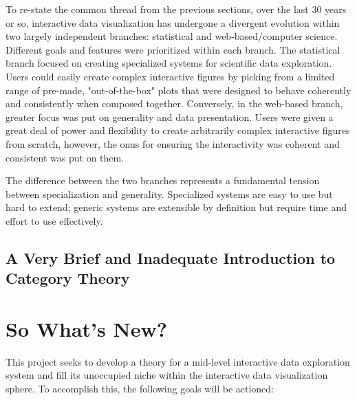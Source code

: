 \documentclass[12pt,a4paper]{article}
\begin{document}
To re-state the common thread from the previous sections, over the last 30 years or so, interactive data visualization has undergone a divergent evolution within two largely independent branches: statistical and web-based/computer science. Different goals and features were prioritized within each branch. The statistical branch focused on creating specialized systems for scientific data exploration. Users could easily create complex interactive figures by picking from a limited range of pre-made, "out-of-the-box" plots that were designed to behave coherently and consistently when composed together. Conversely, in the web-based branch, greater focus was put on generality and data presentation. Users were given a great deal of power and flexibility to create arbitrarily complex interactive figures from scratch, however, the onus for ensuring the interactivity was coherent and consistent was put on them.

The difference between the two branches represents a fundamental tension between specialization and generality. Specialized systems are easy to use but hard to extend; generic systems are extensible by definition but require time and effort to use effectively.  

\subsection{A Very Brief and Inadequate Introduction to Category Theory}

\section{So What's New?}
\label{sec:whatsnew}

This project seeks to develop a theory for a mid-level interactive data exploration system and fill its unoccupied niche within the interactive data visualization sphere. To accomplish this, the following goals will be actioned:  
\end{document}
